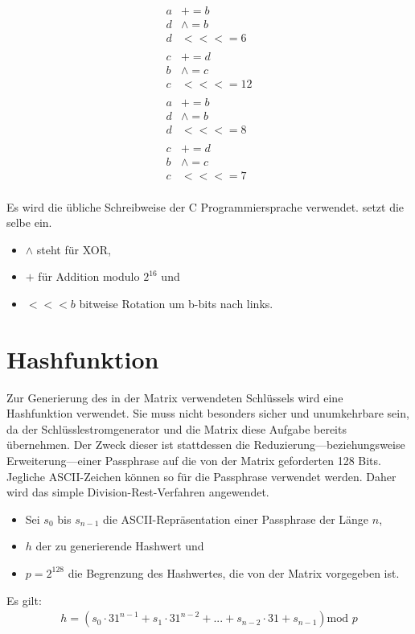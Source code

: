 \documentclass[10pt,a4paper]{article}
\begin{document}
\begin{align*}
    a & +=       b  \\
    d & \wedge = b  \\
    d & <<<=     6  \\
      &             \\
    c & +=       d  \\
    b & \wedge = c  \\
    c & <<<=     12 \\
      &             \\
    a & +=       b  \\
    d & \wedge = b  \\
    d & <<<=     8  \\
      &             \\
    c & +=       d  \\
    b & \wedge = c  \\
    c & <<<=     7  \\
\end{align*}

Es wird die übliche Schreibweise der C Programmiersprache verwendet.
\cite{Bernstein2008} setzt die selbe ein.
\begin{itemize}
    \item $\wedge$ steht für XOR,
    \item $+$ für Addition modulo $2^{16}$ und
    \item $<<<b$ bitweise Rotation um b-bits nach links.
\end{itemize}

\section{Hashfunktion}

Zur Generierung des in der Matrix verwendeten Schlüssels wird eine Hashfunktion verwendet.
Sie muss nicht besonders sicher und unumkehrbare sein, da der Schlüsslestromgenerator und die Matrix diese Aufgabe bereits übernehmen.
Der Zweck dieser ist stattdessen die Reduzierung---beziehungsweise Erweiterung---einer Passphrase auf die von der Matrix geforderten 128 Bits.
Jegliche ASCII-Zeichen können so für die Passphrase verwendet werden.
Daher wird das simple Division-Rest-Verfahren\cite{Silies2021} angewendet.

\begin{itemize}
    \item Sei $s_0$ bis $s_{n-1}$ die ASCII-Repräsentation einer Passphrase der Länge $n$,
    \item $h$ der zu generierende Hashwert und
    \item $p = 2^{128}$ die Begrenzung des Hashwertes, die von der Matrix vorgegeben ist.
\end{itemize}
Es gilt:
\begin{align*}
    h = \left( s_0 \cdot 31^{n-1} + s_1 \cdot 31^{n-2} + ... + s_{n-2} \cdot 31 + s_{n-1}\right)\text{mod } p
\end{align*}
\end{document}
